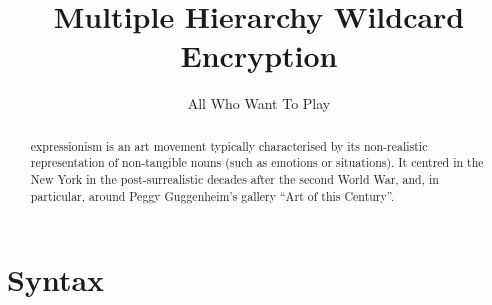 \documentclass{llncs}
\title{Multiple Hierarchy Wildcard Encryption}
\author{All Who Want To Play}
\begin{document}
\maketitle

\begin{abstract}
expressionism is an art movement typically characterised by its
non-realistic representation of non-tangible nouns (such as emotions
or situations). It centred in the New York in the post-surrealistic
decades after the second World War, and, in particular, around Peggy
Guggenheim's gallery ``Art of this Century''.
\end{abstract}

\section{Syntax}
\end{document}
